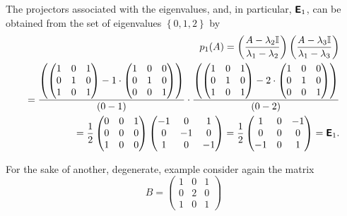 {The projectors associated with the eigenvalues, and, in particular, $\textsf{\textbf{E}}_1$,
can be obtained from  the set of eigenvalues $\left\{  0,1,2 \right\}$ by
\begin{equation}
\begin{split}
p_1(A)=
\left( \frac{A-\lambda_2{\Bbb I}}{\lambda_1-\lambda_2} \right)
\left( \frac{A-\lambda_3{\Bbb I}}{\lambda_1-\lambda_3} \right) \\
=
\frac{
\left(
\begin{pmatrix}
1&0&1\\
0&1&0\\
1&0&1
\end{pmatrix}
-
1\cdot
\begin{pmatrix}
1&0&0\\
0&1&0\\
0&0&1
\end{pmatrix}
\right)}
{(0-1)}
\cdot
\frac{
\left(
\begin{pmatrix}
1&0&1\\
0&1&0\\
1&0&1
\end{pmatrix}
-
2\cdot
\begin{pmatrix}
1&0&0\\
0&1&0\\
0&0&1
\end{pmatrix}
\right)}
{(0-2)}
\\
=
\frac{1}{2}
\begin{pmatrix}
0&0&1\\
0&0&0\\
1&0&0
\end{pmatrix}
\begin{pmatrix}
-1&0&1\\
0&-1&0\\
1&0&-1
\end{pmatrix}
=
\frac{1}{2}
\begin{pmatrix}
1&0&-1\\
0&0&0\\
-1&0&1
\end{pmatrix}
=\textsf{\textbf{E}}_1.
\end{split}
\end{equation}

For the sake of another, degenerate, example consider again the
{matrix}
\begin{equation}
B=
\begin{pmatrix}
1&0&1\\
0&2&0\\
1&0&1
\end{pmatrix}
\end{equation}



}
